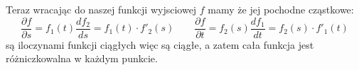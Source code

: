 \documentclass[11pt]{scrartcl}
\begin{document}
\begin{walk}
          Teraz wracając do naszej funkcji wyjsciowej $f$ mamy że jej pochodne cząstkowe:
          \[
              \frac{\partial f}{\partial s} = f_1 (t) \frac{df_2}{ds} = f_1(t) \cdot f'_2(s) \qquad 
              \frac{\partial f}{\partial t} = f_2 (s) \frac{df_1}{dt} = f_2(s) \cdot f'_1(t)
          \]
          są iloczynami funkcji ciągłych więc są ciągłe, a zatem cała funkcja jest różniczkowalna w każdym punkcie.

    \end{walk}
    
\end{document}
